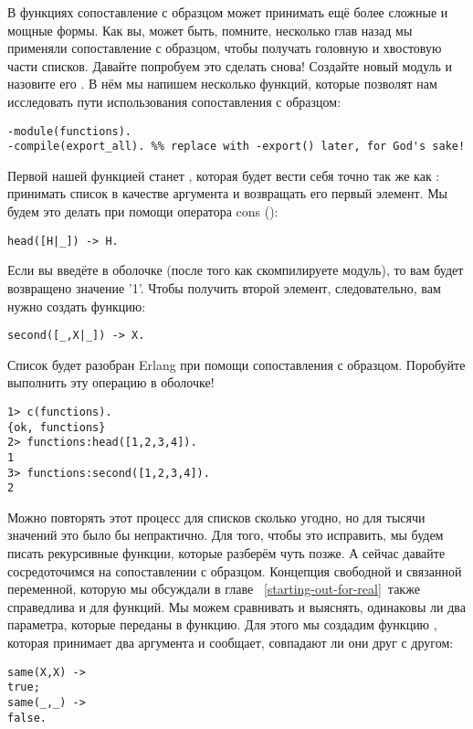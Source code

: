 В функциях сопоставление с образцом может принимать ещё более сложные и мощные формы.
Как вы, может быть, помните, несколько глав назад мы применяли сопоставление с образцом, чтобы получать головную и хвостовую части списков.
Давайте попробуем это сделать снова!
Создайте новый модуль и назовите его .
В нём мы напишем несколько функций, которые позволят нам исследовать пути использования сопоставления с образцом:
\begin{lstlisting}[style=erlang]
-module(functions).
-compile(export_all). %% replace with -export() later, for God's sake!
\end{lstlisting}

Первой нашей функцией станет , которая будет вести себя точно так же как : принимать список в качестве аргумента и возвращать его первый элемент.
Мы будем это делать при помощи оператора cons (\ops{\strut|}):
\begin{lstlisting}[style=erlang]
head([H|_]) -> H.
\end{lstlisting}

Если вы введёте в оболочке  (после того как скомпилируете модуль), то вам будет возвращено значение '1'.
Чтобы получить второй элемент, следовательно, вам нужно создать функцию: 
\begin{lstlisting}[style=erlang]
second([_,X|_]) -> X.
\end{lstlisting}

Список будет разобран Erlang при помощи сопоставления с образцом.
Поробуйте выполнить эту операцию в оболочке!
\begin{lstlisting}[style=erlang]
1> c(functions).
{ok, functions}
2> functions:head([1,2,3,4]).
1
3> functions:second([1,2,3,4]).
2
\end{lstlisting}

Можно повторять этот процесс для списков сколько угодно, но для тысячи значений это было бы непрактично.
Для того, чтобы это исправить, мы будем писать рекурсивные функции, которые разберём чуть позже.
А сейчас давайте сосредоточимся на сопоставлении с образцом.
Концепция свободной и связанной переменной, которую мы обсуждали в главе ~\ref{starting-out-for-real}~также справедлива и для функций.
Мы можем сравнивать и выяснять, одинаковы ли два параметра, которые переданы в функцию.
Для этого мы создадим функцию , которая принимает два аргумента и сообщает, совпадают ли они друг с другом:
\begin{lstlisting}[style=erlang]
same(X,X) ->
true;
same(_,_) ->
false.
\end{lstlisting}


